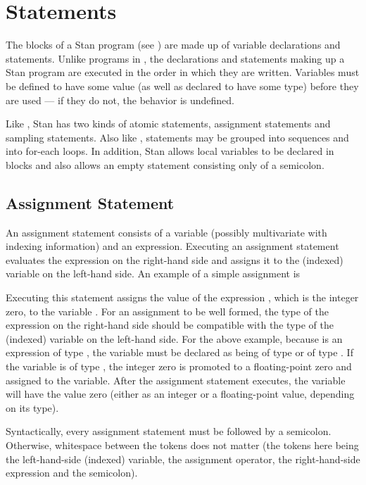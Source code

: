 \chapter{Statements}

\noindent
The blocks of a Stan program (see ) are made up of
variable declarations and statements.  Unlike programs in \BUGS, the
declarations and statements making up a Stan program are executed in
the order in which they are written.  Variables must be defined to
have some value (as well as declared to have some type) before they
are used --- if they do not, the behavior is undefined.

Like \BUGS, Stan has two kinds of atomic statements, assignment
statements and sampling statements.  Also like \BUGS, statements may
be grouped into sequences and into for-each loops.  In addition, Stan
allows local variables to be declared in blocks and also allows an
empty statement consisting only of a semicolon.

\section{Assignment Statement}\label{assignment-statement.section}

An assignment statement consists of a variable (possibly multivariate
with indexing information) and an expression.  Executing an
assignment statement evaluates the expression on the right-hand side
and assigns it to the (indexed) variable on the left-hand side.  An
example of a simple assignment is
%
\begin{quote}
\end{quote}
%
Executing this statement assigns the value of the expression ,
which is the integer zero, to the variable .  For an assignment
to be well formed, the type of the expression on the right-hand side
should be compatible with the type of the (indexed) variable on the
left-hand side.  For the above example, because  is an
expression of type , the variable  must be declared
as being of type  or of type .  If the variable
is of type , the integer zero is promoted to a
floating-point zero and assigned to the variable.  After the
assignment statement executes, the variable  will have the
value zero (either as an integer or a floating-point value, depending on
its type).

Syntactically, every assignment statement must be followed by a
semicolon.  Otherwise, whitespace between the tokens does not matter
(the tokens here being the left-hand-side (indexed) variable, the
assignment operator, the right-hand-side expression and the
semicolon).

